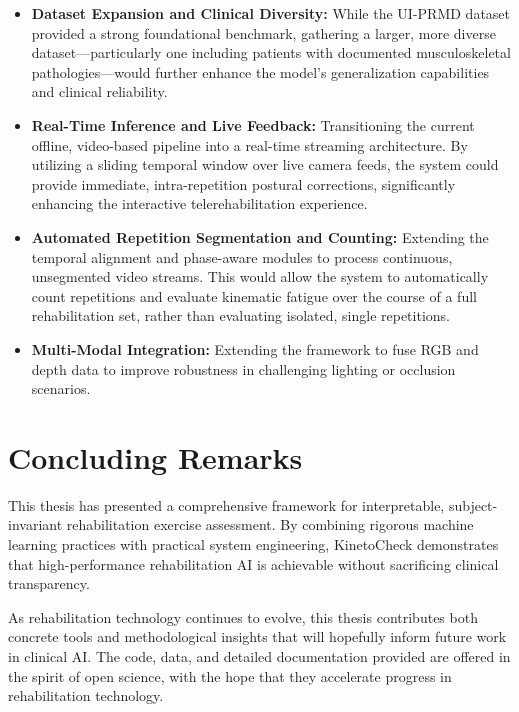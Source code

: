 \begin{itemize}
    \item \textbf{Dataset Expansion and Clinical Diversity:} While the UI-PRMD dataset provided a strong foundational benchmark, gathering a larger, more diverse dataset—particularly one including patients with documented musculoskeletal pathologies—would further enhance the model's generalization capabilities and clinical reliability.
    
    \item \textbf{Real-Time Inference and Live Feedback:} Transitioning the current offline, video-based pipeline into a real-time streaming architecture. By utilizing a sliding temporal window over live camera feeds, the system could provide immediate, intra-repetition postural corrections, significantly enhancing the interactive telerehabilitation experience.
    
    \item \textbf{Automated Repetition Segmentation and Counting:} Extending the temporal alignment and phase-aware modules to process continuous, unsegmented video streams. This would allow the system to automatically count repetitions and evaluate kinematic fatigue over the course of a full rehabilitation set, rather than evaluating isolated, single repetitions.
    \item \textbf{Multi-Modal Integration:} Extending the framework to fuse RGB and depth data to improve robustness in challenging lighting or occlusion scenarios.
\end{itemize}

\section{Concluding Remarks}
This thesis has presented a comprehensive framework for interpretable, subject-invariant rehabilitation exercise assessment. By combining rigorous machine learning practices with practical system engineering, KinetoCheck demonstrates that high-performance rehabilitation AI is achievable without sacrificing clinical transparency.

As rehabilitation technology continues to evolve, this thesis contributes both concrete tools and methodological insights that will hopefully inform future work in clinical AI. The code, data, and detailed documentation provided are offered in the spirit of open science, with the hope that they accelerate progress in rehabilitation technology.